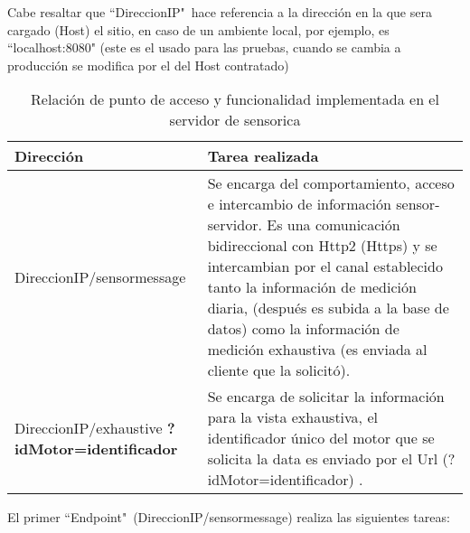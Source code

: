     Cabe resaltar que ``DireccionIP"\ hace referencia a la dirección en la
    que sera cargado (Host) el sitio, en caso de un ambiente local, por
    ejemplo, es ``localhost:8080" (este es el usado para las pruebas,
    cuando se cambia a producción se modifica por el del Host contratado)

    \begin{table}[H]
        \begin{center}
        \caption[Funciones Servidor Sensorica]{ Relación de punto de acceso y
        funcionalidad implementada en el servidor de sensorica}
        \label{tab:ServerSensorica}

            \vspace{0.3cm}
            \begin{tabular}{|p{5cm}|p{10cm}|}
                \hline
                Dirección       & Tarea realizada
                \\\hline\hline
                DireccionIP/sensormessage &
                Se encarga del comportamiento, acceso
                e intercambio de información sensor-servidor. Es una comunicación
                bidireccional con Http2 (Https) y se intercambian por el canal
                establecido tanto la información de medición diaria, (después es
                subida a la base de datos) como la
                información de medición exhaustiva (es enviada al cliente que
                la solicitó).

                \\\hline
                DireccionIP/exhaustive \textbf{?idMotor=identificador}   &
                Se encarga de solicitar la información para la vista exhaustiva,
                el identificador único del motor que se solicita la data
                es enviado por el Url (?idMotor=identificador) .
                \\\hline
            \end{tabular}
        \end{center}
    \end{table}


    El primer ``Endpoint"\ (DireccionIP/sensormessage) realiza las siguientes tareas:

